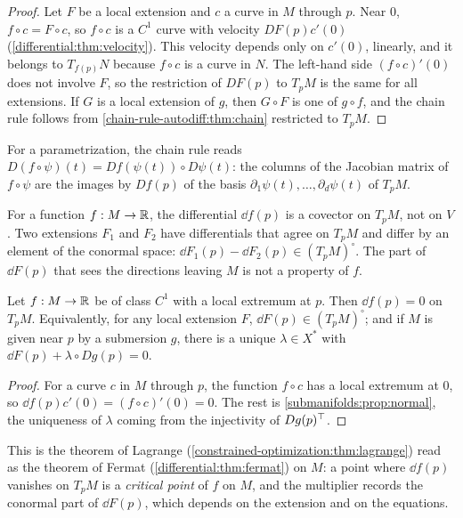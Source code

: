 \begin{notechapter}
\begin{proof}
Let $F$ be a local extension and $c$ a curve in $M$ through $p$. Near
$0$, $f\circ c = F\circ c$, so $f\circ c$ is a $C^1$ curve with velocity
$DF(p)c'(0)$ (\cref{differential:thm:velocity}). This velocity depends
only on $c'(0)$, linearly, and it belongs to $T_{f(p)}N$ because
$f\circ c$ is a curve in $N$. The left-hand side $(f\circ c)'(0)$ does
not involve $F$, so the restriction of $DF(p)$ to $T_pM$ is the same for
all extensions. If $G$ is a local extension of $g$, then $G\circ F$ is one
of $g\circ f$, and the chain rule follows from
\cref{chain-rule-autodiff:thm:chain} restricted to $T_pM$.
\end{proof}

For a parametrization, the chain rule reads
$D(f\circ\psi)(t) = Df(\psi(t))\circ D\psi(t)$: the columns of the
Jacobian matrix of $f\circ\psi$ are the images by $Df(p)$ of the basis
$\partial_1\psi(t),\dots,\partial_d\psi(t)$ of $T_pM$.

\begin{keyidea}
For a function $f:M\to\mathbb{R}$, the differential $\dd f(p)$ is a covector on
$T_pM$, not on $V$. Two extensions $F_1$ and $F_2$ have differentials
that agree on $T_pM$ and differ by an element of the conormal space:
$\dd F_1(p) - \dd F_2(p)\in(T_pM)^\circ$. The part of $\dd F(p)$ that
sees the directions leaving $M$ is not a property of $f$.
\end{keyidea}

\begin{theorem}
\label{submanifolds:thm:critical}
Let $f:M\to\mathbb{R}$ be of class $C^1$ with a local extremum at $p$. Then
$\dd f(p) = 0$ on $T_pM$. Equivalently, for any local extension $F$,
$\dd F(p)\in(T_pM)^\circ$; and if $M$ is given near $p$ by a submersion
$g$, there is a unique $\lambda\in X^*$ with
$\dd F(p) + \lambda\circ Dg(p) = 0$.
\end{theorem}

\begin{proof}
For a curve $c$ in $M$ through $p$, the function $f\circ c$ has a local
extremum at $0$, so $\dd f(p)c'(0) = (f\circ c)'(0) = 0$. The rest is
\cref{submanifolds:prop:normal}, the uniqueness of $\lambda$ coming from
the injectivity of $Dg(p)^{\top}$.
\end{proof}

This is the theorem of Lagrange (\cref{constrained-optimization:thm:lagrange})
read as the theorem of Fermat (\cref{differential:thm:fermat}) on $M$: a
point where $\dd f(p)$ vanishes on $T_pM$ is a \emph{critical point} of
$f$ on $M$, and the multiplier records the conormal part of $\dd F(p)$,
which depends on the extension and on the equations.


\end{notechapter}
